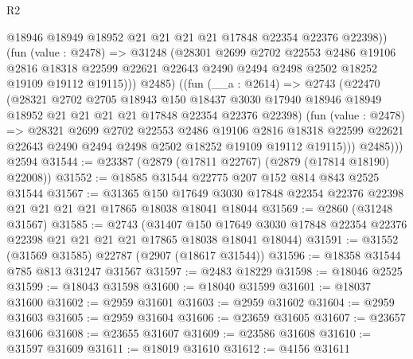\begin{lexlean}{R2}
\begin{coremodule}
              @18946
              @18949
              @18952
              @21
              @21
              @21
              @21
              @17848
              @22354
              @22376
              @22398))
          (fun (value : @2478) =>
          @31248
            (@28301
              @2699
              @2702
              @22553
              @2486
              @19106
              @2816
              @18318
              @22599
              @22621
              @22643
              @2490
              @2494
              @2498
              @2502
              @18252
              @19109
              @19112
              @19115)))
          @2485)
        ((fun (__a : @2614) =>
        @2743
          (@22470
            (@28321
              @2702
              @2705
              @18943
              @150
              @18437
              @3030
              @17940
              @18946
              @18949
              @18952
              @21
              @21
              @21
              @21
              @17848
              @22354
              @22376
              @22398)
            (fun (value : @2478) =>
            @28321
              @2699
              @2702
              @22553
              @2486
              @19106
              @2816
              @18318
              @22599
              @22621
              @22643
              @2490
              @2494
              @2498
              @2502
              @18252
              @19109
              @19112
              @19115)))
          @2485)))
    @2594
@31544 := @23387 (@2879 (@17811 @22767) (@2879 (@17814 @18190) @22008))
@31552 := @18585 @31544 @22775 @207 @152 @814 @843 @2525 @31544
@31567 := @31365
    @150
    @17649
    @3030
    @17848
    @22354
    @22376
    @22398
    @21
    @21
    @21
    @21
    @17865
    @18038
    @18041
    @18044
@31569 := @2860 (@31248 @31567)
@31585 := @2743
    (@31407
      @150
      @17649
      @3030
      @17848
      @22354
      @22376
      @22398
      @21
      @21
      @21
      @21
      @17865
      @18038
      @18041
      @18044)
@31591 := @31552 (@31569 @31585) @22787 (@2907 (@18617 @31544))
@31596 := @18358 @31544 @785 @813 @31247 @31567
@31597 := @2483 @18229
@31598 := @18046 @2525
@31599 := @18043 @31598
@31600 := @18040 @31599
@31601 := @18037 @31600
@31602 := @2959 @31601
@31603 := @2959 @31602
@31604 := @2959 @31603
@31605 := @2959 @31604
@31606 := @23659 @31605
@31607 := @23657 @31606
@31608 := @23655 @31607
@31609 := @23586 @31608
@31610 := @31597 @31609
@31611 := @18019 @31610
@31612 := @4156 @31611

\end{coremodule}
\end{lexlean}
